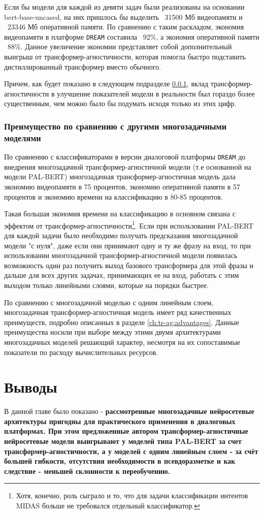 Если бы модели для каждой из девяти задач были реализованы на основании bert-base-uncased, на них пришлось бы выделить ~31500 Мб видеопамяти и ~23346 Мб оперативной памяти. По сравнению с таким раскладом, экономия видеопамяти в платформе \texttt{DREAM} составила ~92\%, а экономия оперативной памяти ~88\%. Данное увеличение экономии представляет собой дополнительный выигрыш от трансформер-агностичности, которая помогла быстро подставить дистиллированный трансформер вместо обычного.

Причем, как будет показано в следующем подразделе \ref{economy_real}, вклад трансформер-агностичности в улучшение показателей модели в реальности был гораздо более существенным, чем можно было бы подумать исходя только из этих цифр. 

\subsubsection{Преимущество по сравнению с другими многозадачными моделями}
\label{economy_real} 
По сравнению с классификаторами в версии диалоговой платформы \texttt{DREAM} до внедрения многозадачной трансформер-агностичной модели (т.е основанной на модели PAL-BERT) многозадачная трансформер-агностичная модель дала экономию видеопамяти в 75 процентов, экономию оперативной памяти в 57 процентов и экономию времени на классификацию в 80-85 процентов.
 
Такая большая экономия времени на классификацию в основном связана с эффектом от трансформер-агностичности\footnote{Хотя, конечно, роль сыграло и то, что для задачи классификации интентов MIDAS больше не требовался отдельный классификатор.}. Если при использовании PAL-BERT для каждой задачи было необходимо получать предсказания многозадачной модели "с нуля", даже если они принимают одну и ту же фразу на вход, то при использовании многозадачной трансформер-агностичной модели появилась возможность один раз получить выход базового трансформера для этой фразы и дальше для всех других задачах, принимающих ее на вход, работать с этим выходом только линейными слоями, которые на порядки быстрее. 

По сравнению с многозадачной моделью с одним линейным слоем, многозадачная трансформер-агностичная модель имеет ряд качественных преимуществ, подробно описанных в разделе \ref{ch:tr-ag:advantages}. Данные преимущества носили при выборе между этими двумя архитектурами многозадачных моделей решающий характер, несмотря на их сопоставимые показатели по расходу вычислительных ресурсов.

\section{Выводы}
В данной главе было показано - \textbf{рассмотренные многозадачные нейросетевые архитектуры пригодны для практического применения в диалоговых платформах. При этом предложенные автором трансформер-агностичные нейросетевые модели выигрывают у моделей типа PAL-BERT за счет трансформер-агностичности, а у моделей с одним линейным слоем - за счёт большей гибкости, отсутствия необходимости в псевдоразметке и как следствие - меньшей склонности к переобучению.}



